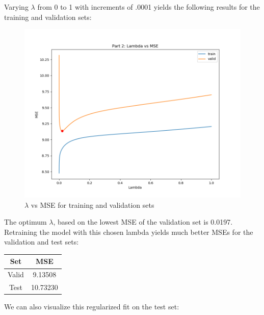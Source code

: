 \documentclass[paper=a4, fontsize=11pt]{scrartcl} %
\numberwithin{equation}{section} %
\numberwithin{figure}{section} %
\numberwithin{table}{section} %
\begin{document}
Varying \(\lambda\) from 0 to 1 with increments of .0001 yields the following results for the training and validation sets:

\begin{figure}[H]
    \includegraphics[width=\linewidth]{q1p14.png}
    \caption{\(\lambda\) vs MSE for training and validation sets}
    \label{fig:q1p14}
\end{figure}

The optimum \(\lambda\), based on the lowest MSE of the validation set is 0.0197. Retraining the model with this chosen lambda yields much better MSEs for the validation and test sets:

\begin{center}
\begin{tabular}{ |c|c| } 
    \hline
    \textbf{Set} & \textbf{MSE} \\ 
    \hline
    Valid & 9.13508 \\ 
    Test & 10.73230 \\
    \hline
\end{tabular}
\end{center}

We can also visualize this regularized fit on the test set:
\end{document}
